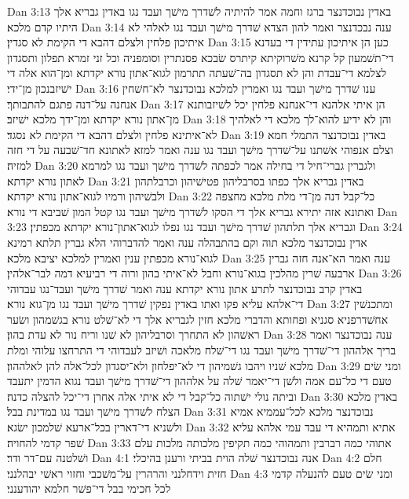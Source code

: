 Dan 3:13  באדין נבוכדנצר ברגז וחמה אמר להיתיה לשׁדרך מישׁך ועבד נגו באדין גבריא אלך היתיו קדם מלכא׃
Dan 3:14  ענה נבכדנצר ואמר להון הצדא שׁדרך מישׁך ועבד נגו לאלהי לא איתיכון פלחין ולצלם דהבא די הקימת לא סגדין׃
Dan 3:15  כען הן איתיכון עתידין די בעדנא די־תשׁמעון קל קרנא משׁרוקיתא קיתרס שׂבכא פסנתרין וסומפניה וכל זני זמרא תפלון ותסגדון לצלמא די־עבדת והן לא תסגדון בה־שׁעתה תתרמון לגוא־אתון נורא יקדתא ומן־הוא אלה די ישׁיזבנכון מן־ידי׃
Dan 3:16  ענו שׁדרך מישׁך ועבד נגו ואמרין למלכא נבוכדנצר לא־חשׁחין אנחנה על־דנה פתגם להתבותך׃
Dan 3:17  הן איתי אלהנא די־אנחנא פלחין יכל לשׁיזבותנא מן־אתון נורא יקדתא ומן־ידך מלכא ישׁיזב׃
Dan 3:18  והן לא ידיע להוא־לך מלכא די לאלהיך לא־איתינא פלחין ולצלם דהבא די הקימת לא נסגד׃
Dan 3:19  באדין נבוכדנצר התמלי חמא וצלם אנפוהי אשׁתנו על־שׁדרך מישׁך ועבד נגו ענה ואמר למזא לאתונא חד־שׁבעה על די חזה למזיה׃
Dan 3:20  ולגברין גברי־חיל די בחילה אמר לכפתה לשׁדרך מישׁך ועבד נגו למרמא לאתון נורא יקדתא׃
Dan 3:21  באדין גבריא אלך כפתו בסרבליהון פטישׁיהון וכרבלתהון ולבשׁיהון ורמיו לגוא־אתון נורא יקדתא׃
Dan 3:22  כל־קבל דנה מן־די מלת מלכא מחצפה ואתונא אזה יתירא גבריא אלך די הסקו לשׁדרך מישׁך ועבד נגו קטל המון שׁביבא די נורא׃
Dan 3:23  וגבריא אלך תלתהון שׁדרך מישׁך ועבד נגו נפלו לגוא־אתון־נורא יקדתא מכפתין׃
Dan 3:24  אדין נבוכדנצר מלכא תוה וקם בהתבהלה ענה ואמר להדברוהי הלא גברין תלתא רמינא לגוא־נורא מכפתין ענין ואמרין למלכא יציבא מלכא׃
Dan 3:25  ענה ואמר הא־אנה חזה גברין ארבעה שׁרין מהלכין בגוא־נורא וחבל לא־איתי בהון ורוה די רביעיא דמה לבר־אלהין׃
Dan 3:26  באדין קרב נבוכדנצר לתרע אתון נורא יקדתא ענה ואמר שׁדרך מישׁך ועבד־נגו עבדוהי די־אלהא עליא פקו ואתו באדין נפקין שׁדרך מישׁך ועבד נגו מן־גוא נורא׃
Dan 3:27  ומתכנשׁין אחשׁדרפניא סגניא ופחותא והדברי מלכא חזין לגבריא אלך די לא־שׁלט נורא בגשׁמהון ושׂער ראשׁהון לא התחרך וסרבליהון לא שׁנו וריח נור לא עדת בהון׃
Dan 3:28  ענה נבוכדנצר ואמר בריך אלההון די־שׁדרך מישׁך ועבד נגו די־שׁלח מלאכה ושׁיזב לעבדוהי די התרחצו עלוהי ומלת מלכא שׁניו ויהבו גשׁמיהון די לא־יפלחון ולא־יסגדון לכל־אלה להן לאלההון׃
Dan 3:29  ומני שׂים טעם די כל־עם אמה ולשׁן די־יאמר שׁלה על אלההון די־שׁדרך מישׁך ועבד נגוא הדמין יתעבד וביתה נולי ישׁתוה כל־קבל די לא איתי אלה אחרן די־יכל להצלה כדנה׃
Dan 3:30  באדין מלכא הצלח לשׁדרך מישׁך ועבד נגו במדינת בבל׃
Dan 3:31  נבוכדנצר מלכא לכל־עממיא אמיא ולשׁניא די־דארין בכל־ארעא שׁלמכון ישׂגא׃
Dan 3:32  אתיא ותמהיא די עבד עמי אלהא עליא שׁפר קדמי להחויה׃
Dan 3:33  אתוהי כמה רברבין ותמהוהי כמה תקיפין מלכותה מלכות עלם ושׁלטנה עם־דר ודר׃
Dan 4:1  אנה נבוכדנצר שׁלה הוית בביתי ורענן בהיכלי׃
Dan 4:2  חלם חזית וידחלנני והרהרין על־משׁכבי וחזוי ראשׁי יבהלנני׃
Dan 4:3  ומני שׂים טעם להנעלה קדמי לכל חכימי בבל די־פשׁר חלמא יהודענני׃
